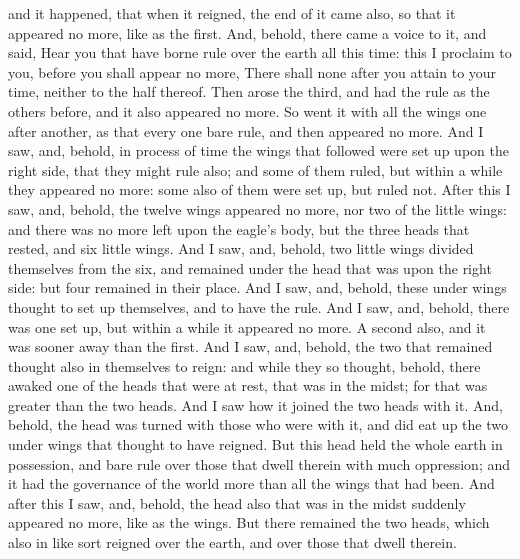 {and it happened, that when it reigned, the end of it came also, so that it appeared no more, like as the first.
And, behold, there came a voice to it, and said,
Hear you that have borne rule over the earth all this time: this I proclaim to you, before you shall appear no more,
There shall none after you attain to your time, neither to the half thereof.
Then arose the third, and had the rule as the others before, and it also appeared no more.
So went it with all the wings one after another, as that every one bare rule, and then appeared no more.
And I saw, and, behold, in process of time the
 wings that followed were set up upon the
 right side, that they might rule also; and some of them ruled, but within a while they appeared no more:
some also of them were set up, but ruled not.
After this I saw, and, behold, the twelve wings appeared no more, nor two of the little wings:
and there was no more left upon the eagle’s body, but the three heads that rested, and six little wings.
And I saw, and, behold, two little wings divided themselves from the six, and remained under the head that was upon the right side: but four remained in their place.
And I saw, and, behold, these
 under wings thought to set up themselves, and to have the rule.
And I saw, and, behold, there was one set up, but within a while it appeared no more.
A second also, and it was sooner away than the first.
And I saw, and, behold, the two that remained thought also in themselves to reign:
and while they so thought, behold, there awaked one of the heads that were at rest,
{} that was in the midst; for that was greater than the two
{} heads.
And I saw how it joined the two
{} heads with it.
And, behold, the head was turned with those who were with it, and did eat up the two
 under wings that thought to have reigned.
But this head held the whole earth in possession, and bare rule over those that dwell therein with much oppression; and it had the governance of the world more than all the wings that had been.
And after this I saw, and, behold, the head also that was in the midst suddenly appeared no more, like as the wings.
But there remained the two heads, which also in like sort reigned over the earth, and over those that dwell therein.
}
